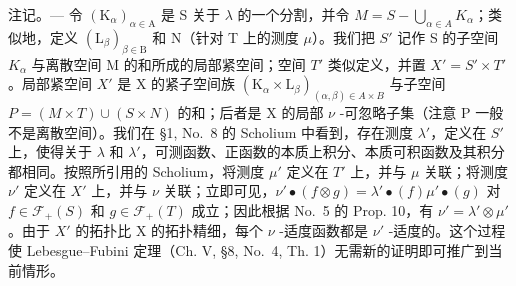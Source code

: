 注记。--- 令 \((\mathrm{K}_{\alpha})_{\alpha\in\mathrm{A}}\) 是 S 关于 \(\lambda\) 的一个分割，并令 \(M = S - \bigcup_{\alpha\in A} K_{\alpha}\)；类似地，定义 \((\mathrm{L}_{\beta})_{\beta\in\mathrm{B}}\) 和 N（针对 T 上的测度 \(\mu\)）。我们把 \(S'\) 记作 S 的子空间 \(K_{\alpha}\) 与离散空间 M 的和所成的局部紧空间；空间 \(T'\) 类似定义，并置 \(X' = S' \times T'\)。局部紧空间 \(X'\) 是 X 的紧子空间族 \((\mathrm{K}_{\alpha} \times \mathrm{L}_{\beta})_{(\alpha,\beta)\in A\times B}\) 与子空间 \(P = (M \times T) \cup (S \times N)\) 的和；后者是 X 的局部 \(\nu\) -可忽略子集（注意 P 一般不是离散空间）。我们在 §1, No.~8 的 Scholium 中看到，存在测度 \(\lambda'\)，定义在 \(S'\) 上，使得关于 \(\lambda\) 和 \(\lambda'\)，可测函数、正函数的本质上积分、本质可积函数及其积分都相同。按照所引用的 Scholium，将测度 \(\mu'\) 定义在 \(T'\) 上，并与 \(\mu\) 关联；将测度 \(\nu'\) 定义在 \(X'\) 上，并与 \(\nu\) 关联；立即可见，\(\nu'\bullet(f \otimes g) = \lambda'\bullet(f)\mu'\bullet(g)\) 对 \(f \in \mathcal{F}_{+}(S)\) 和 \(g \in \mathcal{F}_{+}(T)\) 成立；因此根据 No.~5 的 Prop. 10，有 \(\nu' = \lambda' \otimes \mu'\)。由于 \(X'\) 的拓扑比 X 的拓扑精细，每个 \(\nu\) -适度函数都是 \(\nu'\) -适度的。这个过程使 Lebesgue--Fubini 定理（Ch. V, §8, No.~4, Th. 1）无需新的证明即可推广到当前情形。

